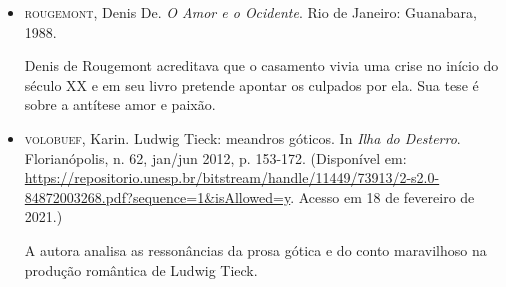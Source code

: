\documentclass[11pt]{extarticle}
\begin{document}
\begin{itemize}
\item\textsc{rougemont}, Denis De. \textit{O Amor e o Ocidente}. Rio de Janeiro:
Guanabara, 1988.

Denis de Rougemont acreditava que o casamento vivia uma crise no início
do século XX e em seu livro pretende apontar os culpados por ela. Sua
tese é sobre a antítese amor e paixão.

\item\textsc{volobuef}, Karin. Ludwig Tieck: meandros góticos. In \emph{Ilha
do Desterro}. Florianópolis, n. 62, jan/jun 2012, p. 153-172.
(Disponível em:
\url{https://repositorio.unesp.br/bitstream/handle/11449/73913/2-s2.0-84872003268.pdf?sequence=1\&isAllowed=y}.
Acesso em 18 de fevereiro de 2021.)

A autora analisa as ressonâncias da prosa gótica e do conto maravilhoso
na produção romântica de Ludwig Tieck.
\end{itemize}
\end{document}
